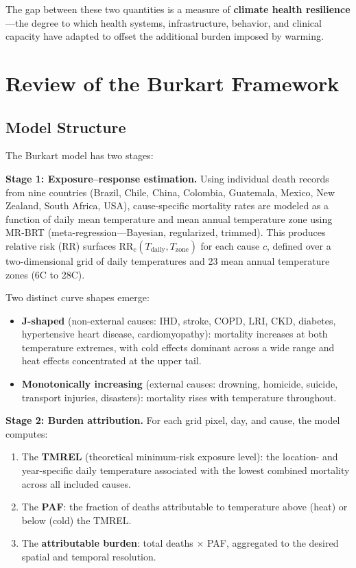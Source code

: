 \documentclass[11pt,a4paper]{article}
\begin{document}
The gap between these two quantities is a measure of \textbf{climate health resilience}---the degree to which health systems, infrastructure, behavior, and clinical capacity have adapted to offset the additional burden imposed by warming.

\section{Review of the Burkart Framework}

\subsection{Model Structure}

The Burkart model has two stages:

\textbf{Stage 1: Exposure--response estimation.} Using individual death records from nine countries (Brazil, Chile, China, Colombia, Guatemala, Mexico, New Zealand, South Africa, USA), cause-specific mortality rates are modeled as a function of daily mean temperature and mean annual temperature zone using MR-BRT (meta-regression---Bayesian, regularized, trimmed). This produces relative risk (RR) surfaces $\text{RR}_c(T_{\text{daily}}, T_{\text{zone}})$ for each cause $c$, defined over a two-dimensional grid of daily temperatures and 23 mean annual temperature zones (6\textdegree C to 28\textdegree C).

Two distinct curve shapes emerge:
\begin{itemize}[nosep]
  \item \textbf{J-shaped} (non-external causes: IHD, stroke, COPD, LRI, CKD, diabetes, hypertensive heart disease, cardiomyopathy): mortality increases at both temperature extremes, with cold effects dominant across a wide range and heat effects concentrated at the upper tail.
  \item \textbf{Monotonically increasing} (external causes: drowning, homicide, suicide, transport injuries, disasters): mortality rises with temperature throughout.
\end{itemize}

\textbf{Stage 2: Burden attribution.} For each grid pixel, day, and cause, the model computes:
\begin{enumerate}[nosep]
  \item The \textbf{TMREL} (theoretical minimum-risk exposure level): the location- and year-specific daily temperature associated with the lowest combined mortality across all included causes.
  \item The \textbf{PAF}: the fraction of deaths attributable to temperature above (heat) or below (cold) the TMREL.
  \item The \textbf{attributable burden}: total deaths $\times$ PAF, aggregated to the desired spatial and temporal resolution.
\end{enumerate}
\end{document}
